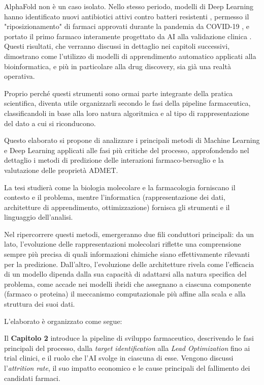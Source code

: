 AlphaFold non è un caso isolato. Nello stesso periodo, 
modelli di Deep Learning hanno identificato nuovi 
antibiotici attivi contro batteri resistenti 
\cite{stokesDeepLearningApproach2020}, permesso il 
"riposizionamento" di farmaci approvati durante 
la pandemia da COVID-19 \cite{richardsonBaricitinibPotentialTreatment2020}, 
e portato il primo farmaco interamente progettato da AI 
alla validazione clinica
\cite{xuGenerativeAIDiscoveredTNIK2025} \cite{renSmallmoleculeTNIKInhibitor2025}. Questi risultati, 
che verranno discussi in dettaglio nei capitoli successivi, 
dimostrano come l'utilizzo di modelli di apprendimento automatico applicati alla bioinformatica, e più in particolare alla drug discovery, sia già una realtà operativa.

Proprio perché questi strumenti sono ormai parte integrante della pratica scientifica, diventa utile organizzarli secondo le fasi della pipeline farmaceutica, classificandoli in base alla loro natura algoritmica e al tipo di rappresentazione del dato a cui si riconducono.

Questo elaborato si propone di analizzare i principali 
metodi di Machine Learning e Deep Learning applicati 
alle fasi più critiche del processo, 
approfondendo nel dettaglio i metodi di predizione delle 
interazioni farmaco-bersaglio e la valutazione delle 
proprietà ADMET.

La tesi studierà come la biologia molecolare e la farmacologia forniscano il 
contesto e il problema, mentre l'informatica (rappresentazione dei dati, architetture di apprendimento, 
ottimizzazione) fornisca gli strumenti e il linguaggio 
dell'analisi.

Nel ripercorrere questi metodi, emergeranno due fili conduttori principali:
da un lato, l'evoluzione delle rappresentazioni molecolari riflette una comprensione sempre più precisa di quali informazioni chimiche siano effettivamente rilevanti per la predizione. Dall'altro,
l'evoluzione delle architetture rivela come l'efficacia di un modello dipenda dalla sua capacità di adattarsi alla natura specifica del problema, come accade nei modelli ibridi che assegnano a ciascuna componente (farmaco o proteina) il meccanismo computazionale più affine alla scala e alla struttura dei suoi dati.

L'elaborato è organizzato come segue:

Il \textbf{Capitolo 2} introduce la pipeline di sviluppo 
farmaceutico, descrivendo le fasi principali del processo, dalla \textit{target identification} alla \textit{Lead Optimization} fino 
ai trial clinici, e il ruolo che l'AI svolge in ciascuna 
di esse. 
Vengono discussi l'\textit{attrition rate}, il suo impatto 
economico e le cause principali del fallimento dei candidati 
farmaci.

